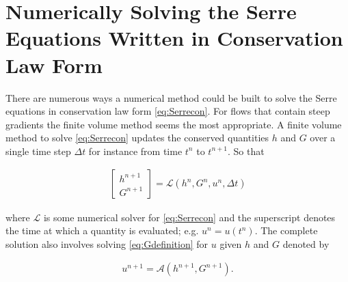 \documentclass[SingleSpace,12pt,Proceedings]{Serre_ASCE}
\begin{document}
\section{Numerically Solving the Serre Equations Written in Conservation Law Form}
\label{section:Solving the Serre Equations Written in Conservation Law Form}
There are numerous ways a numerical method could be built to solve the Serre equations in conservation law form \eqref{eq:Serrecon}. For flows that contain steep gradients the finite volume method seems the most appropriate. A finite volume method to solve \eqref{eq:Serrecon} updates the conserved quantities $h$ and $G$ over a single time step $\Delta t$ for instance from time $t^n$ to $t^{n+1}$. So that
\begin{linenomath*}
\begin{gather}
\left[\begin{array}{c}
 h^{n+1} \\
 G^{n+1} \end{array}\right] = \mathcal{L}(h^{n},G^{n},u^n,\Delta t)
\label{eq:L}
\end{gather}
\end{linenomath*}
where $\mathcal{L}$ is some numerical solver for \eqref{eq:Serrecon} and the superscript denotes the time at which a quantity is evaluated; e.g. $u^n = u(t^n)$. The complete solution also involves solving \eqref{eq:Gdefinition} for $u$ given $h$ and $G$ denoted by 
\begin{linenomath*}
\begin{gather}
u^{n+1} = \mathcal{A}(h^{n+1},G^{n+1}) .
\label{eq:A}
\end{gather}
\end{linenomath*}
\end{document}
